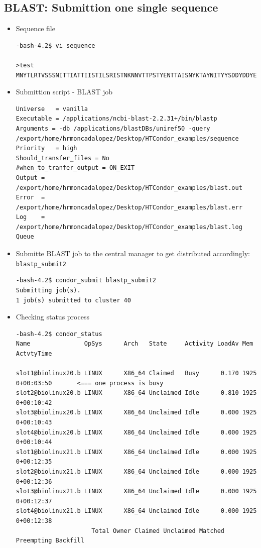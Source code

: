 \documentclass{article}
\begin{document}
\subsection{BLAST: Submittion one single sequence}
\begin{itemize}
\item Sequence file
\scriptsize\begin{verbatim}
-bash-4.2$ vi sequence 

>test
MNYTLRTVSSSNITTIATTIISTILSRISTNKNNVTTPSTYENTTAISNYKTAYNITYYSDDYDDYEVNIVDIPHCDDGVYTT
\end{verbatim}
\normalsize
\item Submittion script - BLAST job
\scriptsize\begin{verbatim}
Universe   = vanilla
Executable = /applications/ncbi-blast-2.2.31+/bin/blastp
Arguments = -db /applications/blastDBs/uniref50 -query /export/home/hrmoncadalopez/Desktop/HTCondor_examples/sequence
Priority   = high
Should_transfer_files = No
#when_to_tranfer_output = ON_EXIT
Output = /export/home/hrmoncadalopez/Desktop/HTCondor_examples/blast.out
Error  = /export/home/hrmoncadalopez/Desktop/HTCondor_examples/blast.err
Log    = /export/home/hrmoncadalopez/Desktop/HTCondor_examples/blast.log
Queue
\end{verbatim}
\normalsize
\item Submitte BLAST job to the central manager to get distributed accordingly:  \verb+blastp_submit2+
\scriptsize\begin{verbatim}
-bash-4.2$ condor_submit blastp_submit2
Submitting job(s).
1 job(s) submitted to cluster 40
\end{verbatim}
\normalsize
\item Checking status process
\scriptsize\begin{verbatim}
-bash-4.2$ condor_status
Name               OpSys      Arch   State     Activity LoadAv Mem   ActvtyTime

slot1@biolinux20.b LINUX      X86_64 Claimed   Busy      0.170 1925  0+00:03:50       <=== one process is busy
slot2@biolinux20.b LINUX      X86_64 Unclaimed Idle      0.810 1925  0+00:10:42
slot3@biolinux20.b LINUX      X86_64 Unclaimed Idle      0.000 1925  0+00:10:43
slot4@biolinux20.b LINUX      X86_64 Unclaimed Idle      0.000 1925  0+00:10:44
slot1@biolinux21.b LINUX      X86_64 Unclaimed Idle      0.000 1925  0+00:12:35
slot2@biolinux21.b LINUX      X86_64 Unclaimed Idle      0.000 1925  0+00:12:36
slot3@biolinux21.b LINUX      X86_64 Unclaimed Idle      0.000 1925  0+00:12:37
slot4@biolinux21.b LINUX      X86_64 Unclaimed Idle      0.000 1925  0+00:12:38
                     Total Owner Claimed Unclaimed Matched Preempting Backfill
 

\end{verbatim}
\end{itemize}
\end{document}
